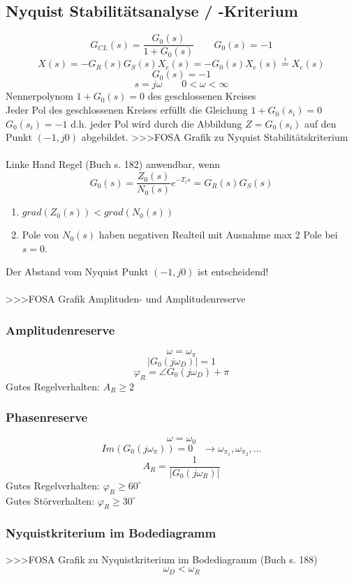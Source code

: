 \subsection{Nyquist Stabilitätsanalyse / -Kriterium}
\[ G_{CL}(s) = \frac{G_0(s)}{1 + G_0(s)} \qquad G_0(s) = -1 \]
\[ X(s) = - G_R(s) G_S(s) X_e(s) = -G_0(s) X_e(s) \stackrel{!}{=} X_e(s) \]
\[ G_0(s) = -1 \]
\[ s = j \omega \qquad 0 < \omega < \infty \]
Nennerpolynom $ 1 + G_0(s) = 0 $ des geschlossenen Kreises\\
Jeder Pol des geschlossenen Kreises erfüllt die Gleichung $1 + G_0(s_i) = 0$ 
$G_0(s_i) = -1$ d.h. jeder Pol wird durch die Abbildung $Z = G_0(s_i)$ auf 
den Punkt $(-1, j 0)$ abgebildet. 
>>>FOSA Grafik zu Nyquist Stabilitätskriterium\\\\
Linke Hand Regel (Buch s. 182) anwendbar, wenn
\[ G_0(s) = \frac{Z_0(s)}{N_0(s)} e^{-T_t s} = G_R(s) G_S(s) \]
\begin{enumerate}
    \item $grad(Z_0(s)) < grad(N_0(s))$
    \item Pole von $N_0(s)$ haben negativen Realteil mit Ausnahme max 2 Pole 
        bei $s = 0$. 
\end{enumerate}
Der Abstand vom Nyquist Punkt $(-1, j 0)$ ist entscheidend! \\\\
>>>FOSA Grafik Amplituden- und Amplitudenreserve

\subsubsection{Amplitudenreserve}
\[ \omega = \omega_\pi \]
\[ |G_0(j \omega_D)| = 1 \]
\[ \varphi_R = \angle G_0(j\omega_D) + \pi \]
Gutes Regelverhalten: $A_R \geq 2$

\subsubsection{Phasenreserve}
\[ \omega = \omega_0 \]
\[ Im(G_0(j \omega_\pi)) = 0 \quad \to \omega_{\pi_1}, \omega_{\pi_2} , \ldots \]
\[ A_R = \frac{1}{|G_0(j \omega_R)|} \]
Gutes Regelverhalten: $\varphi_R \geq 60^\circ$\\
Gutes Störverhalten: $\varphi_R \geq 30^\circ$

\subsubsection{Nyquistkriterium im Bodediagramm}
>>>FOSA Grafik zu Nyquistkriterium im Bodediagramm (Buch s. 188)
\[ \omega_D < \omega_R \]

